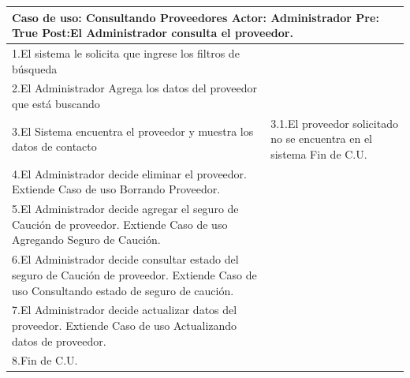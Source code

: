 \begin{longtable}{| p{} | p{} |} 
    \hline
    \multicolumn{2}{|p{16cm}|}{
        \textbf{Caso de uso:} Consultando Proveedores \newline
        \textbf{Actor:} Administrador\newline
        \textbf{Pre:}  True\newline
        \textbf{Post:}El Administrador consulta el proveedor.
    }\\
    \hline
    1.El sistema le solicita que ingrese los filtros de búsqueda  & \\
    \hline
    2.El Administrador Agrega los datos del proveedor que está buscando& \\
    \hline
    3.El Sistema encuentra el proveedor y muestra los datos de contacto & 3.1.El proveedor solicitado no se encuentra en el sistema \newline 3.2 Fin de C.U.  \\
    \hline
    4.El Administrador decide eliminar el proveedor. Extiende Caso de uso Borrando Proveedor.& \\
    \hline
    5.El Administrador decide agregar el seguro de Caución de proveedor. Extiende Caso de uso Agregando Seguro de Caución.& \\
    \hline
    6.El Administrador decide consultar estado del seguro de Caución de proveedor. Extiende Caso de uso Consultando estado de seguro de caución.& \\
    \hline
    7.El Administrador decide actualizar datos del proveedor. Extiende Caso de uso Actualizando datos de proveedor.& \\
    \hline
    8.Fin de C.U.& \\
    \hline
\end{longtable}


